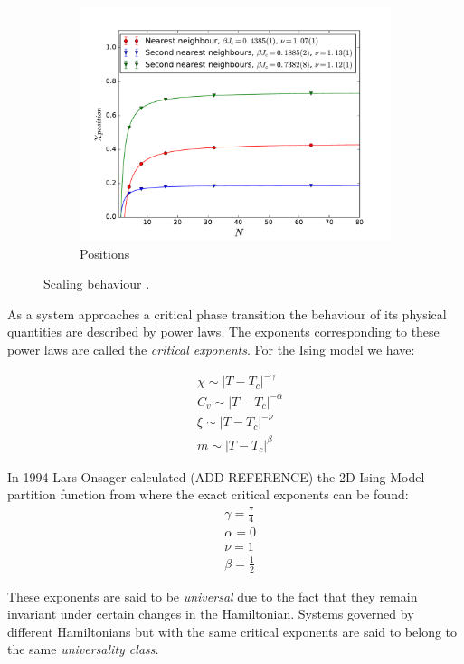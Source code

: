 \documentclass[twoside]{article}
\begin{document}
\begin{multicols}{2}
\begin{figure}[!tpb]
    \begin{subfigure}[b]{0.32\textwidth}
    \includegraphics[width=\textwidth]{images/plot_pos.pdf}
    \caption{Positions}
    \label{scaling_pos}
  \end{subfigure}
  \caption{Scaling behaviour .}
  \label{scaling}
\end{figure}

As a system approaches a critical phase transition the behaviour of its physical quantities are described by power laws. The exponents corresponding to these power laws are called the \emph{critical exponents}. For the Ising model we have:

\begin{align}
&\chi \sim |T-T_c|^{-\gamma} \\
& C_v \sim |T-T_c|^{-\alpha} \\
& \xi \sim |T-T_c|^{-\nu} \\
& m \sim |T-T_c|^{\beta}
\end{align}

In 1994  Lars Onsager calculated (ADD REFERENCE) the 2D Ising Model partition function from where the exact critical exponents can be found:
\begin{align}
&\gamma = \frac{7}{4} \\
&\alpha = 0 \\
&\nu = 1\\
&\beta = \frac{1}{2} 
\end{align}


These exponents are said to be \emph{universal} due to the fact that they remain invariant under certain changes in the Hamiltonian. Systems governed by different Hamiltonians but with the same critical exponents are said to belong to the same \emph{universality class}. 


\end{multicols}
\end{document}
